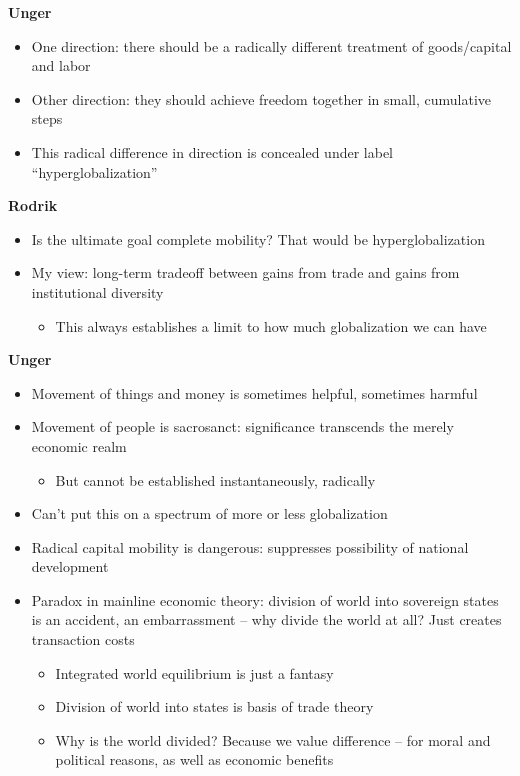 \textbf{Unger}

\begin{itemize}
\tightlist
\item
  One direction: there should be a radically different treatment of
  goods/capital and labor
\item
  Other direction: they should achieve freedom together in small,
  cumulative steps
\item
  This radical difference in direction is concealed under label
  ``hyperglobalization''
\end{itemize}

\textbf{Rodrik}

\begin{itemize}
\tightlist
\item
  Is the ultimate goal complete mobility? That would be
  hyperglobalization
\item
  My view: long-term tradeoff between gains from trade and gains from
  institutional diversity

  \begin{itemize}
  \tightlist
  \item
    This always establishes a limit to how much globalization we can
    have
  \end{itemize}
\end{itemize}

\textbf{Unger}

\begin{itemize}
\tightlist
\item
  Movement of things and money is sometimes helpful, sometimes harmful
\item
  Movement of people is sacrosanct: significance transcends the merely
  economic realm

  \begin{itemize}
  \tightlist
  \item
    But cannot be established instantaneously, radically
  \end{itemize}
\item
  Can't put this on a spectrum of more or less globalization
\item
  Radical capital mobility is dangerous: suppresses possibility of
  national development
\item
  Paradox in mainline economic theory: division of world into sovereign
  states is an accident, an embarrassment -- why divide the world at
  all? Just creates transaction costs

  \begin{itemize}
  \tightlist
  \item
    Integrated world equilibrium is just a fantasy
  \item
    Division of world into states is basis of trade theory
  \item
    Why is the world divided? Because we value difference -- for moral
    and political reasons, as well as economic benefits
  \end{itemize}
\end{itemize}

